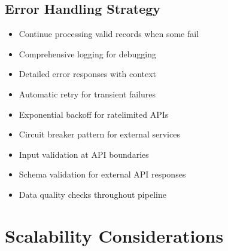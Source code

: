 \documentclass[letterpaper,10pt,english]{sphinxmanual}
\begin{document}
\subsection{Error Handling Strategy}
\label{\detokenize{architecture:error-handling-strategy}}\begin{description}
\begin{itemize}
\item {} 
\sphinxAtStartPar
Continue processing valid records when some fail

\item {} 
\sphinxAtStartPar
Comprehensive logging for debugging

\item {} 
\sphinxAtStartPar
Detailed error responses with context

\end{itemize}

\begin{itemize}
\item {} 
\sphinxAtStartPar
Automatic retry for transient failures

\item {} 
\sphinxAtStartPar
Exponential backoff for rate\sphinxhyphen{}limited APIs

\item {} 
\sphinxAtStartPar
Circuit breaker pattern for external services

\end{itemize}

\begin{itemize}
\item {} 
\sphinxAtStartPar
Input validation at API boundaries

\item {} 
\sphinxAtStartPar
Schema validation for external API responses

\item {} 
\sphinxAtStartPar
Data quality checks throughout pipeline

\end{itemize}

\end{description}


\section{Scalability Considerations}
\label{\detokenize{architecture:scalability-considerations}}
\end{document}
